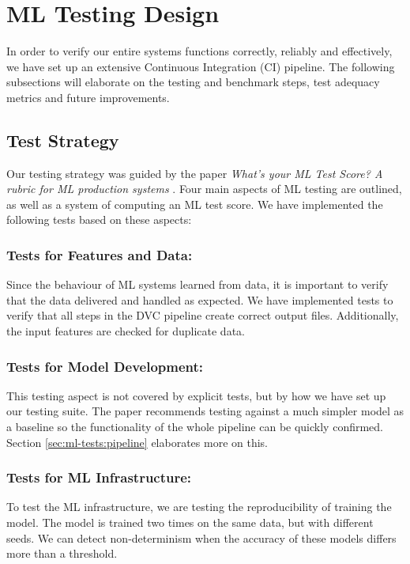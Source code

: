 
\section{ML Testing Design}
In order to verify our entire systems functions correctly, reliably and effectively, we have set up an extensive Continuous Integration (CI) pipeline. The following subsections will elaborate on the testing and benchmark steps, test adequacy metrics and future improvements.

\subsection{Test Strategy}
Our testing strategy was guided by the paper \textit{What’s your ML Test Score? A rubric for ML production systems} \cite{mltestscore}. Four main aspects of ML testing are outlined, as well as a system of computing an ML test score. We have implemented the following tests based on these aspects:

\subsubsection{Tests for Features and Data:} Since the behaviour of ML systems learned from data, it is important to verify that the data delivered and handled as expected. We have implemented tests to verify that all steps in the DVC pipeline create correct output files. Additionally, the input features are checked for duplicate data.

\subsubsection{Tests for Model Development:} This testing aspect is not covered by explicit tests, but by how we have set up our testing suite. The paper recommends testing against a much simpler model as a baseline so the functionality of the whole pipeline can be quickly confirmed. Section \ref{sec:ml-tests:pipeline} elaborates more on this.

\subsubsection{Tests for ML Infrastructure:} To test the ML infrastructure, we are testing the reproducibility of training the model. The model is trained two times on the same data, but with different seeds. We can detect non-determinism when the accuracy of these models differs more than a threshold.

